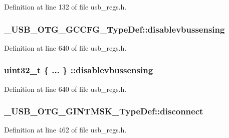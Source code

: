 Definition at line 132 of file usb\-\_\-regs.\-h.

\hypertarget{group___u_s_b___o_t_g___d_r_i_v_e_r_ga621c869741e314cdcdf1969b133e79af}{
\subsubsection[{disablevbussensing}]{ \-\_\-\-U\-S\-B\-\_\-\-O\-T\-G\-\_\-\-G\-C\-C\-F\-G\-\_\-\-Type\-Def\-::disablevbussensing}}\label{group___u_s_b___o_t_g___d_r_i_v_e_r_ga621c869741e314cdcdf1969b133e79af}


Definition at line 640 of file usb\-\_\-regs.\-h.

\hypertarget{group___u_s_b___o_t_g___d_r_i_v_e_r_gaf10054819b8867119510a5e6362bec49}{
\subsubsection[{disablevbussensing}]{\setlength{\rightskip}{0pt plus 5cm}uint32\-\_\-t \{ ... \} \-::disablevbussensing}}\label{group___u_s_b___o_t_g___d_r_i_v_e_r_gaf10054819b8867119510a5e6362bec49}


Definition at line 640 of file usb\-\_\-regs.\-h.

\hypertarget{group___u_s_b___o_t_g___d_r_i_v_e_r_ga74931c2b48f366e97e11919d59e8af59}{
\subsubsection[{disconnect}]{ \-\_\-\-U\-S\-B\-\_\-\-O\-T\-G\-\_\-\-G\-I\-N\-T\-M\-S\-K\-\_\-\-Type\-Def\-::disconnect}}\label{group___u_s_b___o_t_g___d_r_i_v_e_r_ga74931c2b48f366e97e11919d59e8af59}


Definition at line 462 of file usb\-\_\-regs.\-h.

